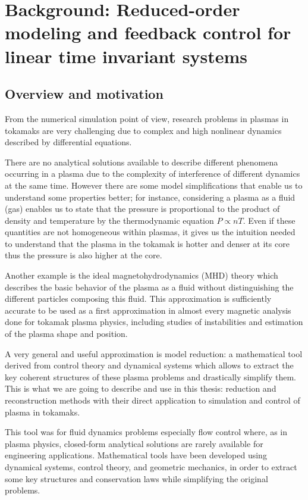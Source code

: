 \documentclass[12pt,lot, lof]{puthesis}
\begin{document}
\chapter{Background: Reduced-order modeling  and feedback control for linear time invariant systems}
\label{chapitre2}

\section{Overview and motivation}

From the numerical simulation point of view, research problems in plasmas in tokamaks are very challenging due to complex and high nonlinear dynamics described by differential equations. %

There are no analytical solutions available to describe different phenomena occurring in a plasma due to the complexity of interference of different dynamics at the same time. However there are some model simplifications that enable us to understand some properties better; for instance, considering a plasma as a fluid (gas) enables us to state that the pressure is proportional to the product of density and temperature by the thermodynamic equation $P \propto n T$. Even if these quantities are not homogeneous within plasmas, it gives us the intuition needed to understand that the plasma in the tokamak is hotter and denser at its core thus the pressure is also higher at the core.

Another example is the ideal magnetohydrodynamics (MHD) theory which describes the basic behavior of the plasma as a fluid without distinguishing the different particles composing this fluid. This approximation is sufficiently accurate to be used as a first approximation in almost every magnetic analysis done for tokamak plasma physics, including studies of instabilities and estimation of the plasma shape and position.

A very general and useful approximation is model reduction: a mathematical tool derived from control theory and dynamical systems which allows to extract the key coherent structures of these plasma problems and drastically simplify them. This is what we are going to describe and use in this thesis: reduction and reconstruction methods with their direct application to simulation and control of plasma in tokamaks.

This tool was for fluid dynamics problems especially flow control where, as in plasma physics, closed-form analytical solutions are rarely available for engineering applications. Mathematical tools have been developed using dynamical systems, control theory, and geometric mechanics, in order to extract some key structures and conservation laws while simplifying the original problems.
\end{document}
